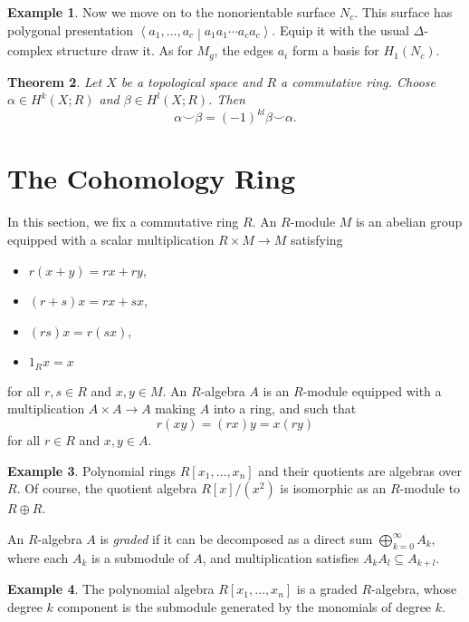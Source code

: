 \documentclass{book}
\newtheorem{theorem}{Theorem}[section]
\theoremstyle{definition}
\newtheorem{example}[theorem]{Example}
\theoremstyle{remark}
\numberwithin{equation}{section}
\begin{document}
\begin{example}
    Now we move on to the nonorientable surface $N_c$. This surface has polygonal presentation $\left\langle a_1,\dots,a_c \middle\vert a_1 a_1 \cdots a_c a_c \right\rangle$. Equip it with the usual $\Delta$-complex structure {\color{red} draw it}. As for $M_g$, the edges $a_i$ form a basis for $H_1(N_c)$.

\end{example} 

\begin{theorem}
    Let $X$ be a topological space and $R$ a commutative ring. Choose $\alpha \in H^k(X;R)$ and $\beta \in H^l(X;R)$. Then 
    \begin{equation}
        \alpha \smile \beta = (-1)^{kl} \beta \smile \alpha. 
    \end{equation}
\end{theorem}


\section{The Cohomology Ring}

In this section, we fix a commutative ring $R$. An $R$-module $M$ is an abelian group equipped with a scalar multiplication $R \times M \to M$ satisfying
\begin{itemize}
    \item $r(x+y) = rx + ry$,
    \item $(r+s)x = rx + sx$,
    \item $(rs)x = r(sx)$,
    \item $1_R x = x$
\end{itemize}
for all $r,s \in R$ and $x,y \in M$. An $R$-algebra $A$ is an $R$-module equipped with a multiplication $A \times A \to A$ making $A$ into a ring, and such that 
\begin{equation}
    r(xy) = (rx)y = x(ry)
\end{equation}
for all $r \in R$ and $x,y \in A$. 
\begin{example}
    Polynomial rings $R[x_1,\dots,x_n]$ and their quotients are algebras over $R$. Of course, the quotient algebra $R[x]/(x^2)$ is isomorphic as an $R$-module to $R \oplus R$.
\end{example}

An $R$-algebra $A$ is \textit{graded} if it can be decomposed as a direct sum $\bigoplus_{k=0}^\infty A_k$, where each $A_k$ is a submodule of $A$, and multiplication satisfies $A_k A_l \subseteq A_{k+l}$.
\begin{example}
    The polynomial algebra $R[x_1,\dots,x_n]$ is a graded $R$-algebra, whose degree $k$ component is the submodule generated by the monomials of degree $k$.
\end{example}
\end{document}

